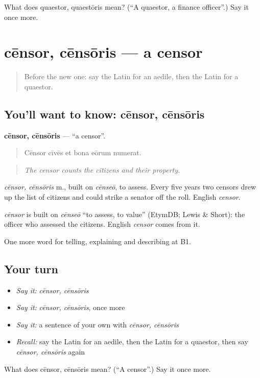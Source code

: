\begin{tcolorbox}[breakable,colback=teal!4,colframe=teal!35!black,title={Before you move on}]
What does quaestor, quaestōris mean? (\textquotedblleft{}A quaestor, a finance officer\textquotedblright{}.) Say it once more.
\end{tcolorbox}
\section[cēnsor, cēnsōris]{cēnsor, cēnsōris — a censor}

\label{lesson:LA-C383-censor}



\begin{quote}
Before the new one: say the Latin for an aedile, then the Latin for a quaestor.
\end{quote}

\subsection*{You'll want to know: cēnsor, cēnsōris}
\textbf{cēnsor, cēnsōris} — \textquotedblleft{}a censor\textquotedblright{}.

\begin{quote}
Cēnsor cīvēs et bona eōrum numerat.
\end{quote}

\begin{quote}
\emph{The censor counts the citizens and their property.}
\end{quote}

\emph{cēnsor, cēnsōris} m., built on \emph{cēnseō}, to assess. Every five years two censors drew up the list of citizens and could strike a senator off the roll. English \emph{censor}.

\begin{cousinweb}
\emph{cēnsor} is built on \emph{cēnseō} \textquotedblleft{}to assess, to value\textquotedblright{} (EtymDB; Lewis \& Short): the officer who assessed the citizens. English \emph{censor} comes from it.
\end{cousinweb}

\begin{grammarlens}[title={What you've built}]
One more word for telling, explaining and describing at B1.
\end{grammarlens}

\subsection*{Your turn}
\begin{itemize}
\raggedright
  \item \emph{Say it:} \emph{cēnsor, cēnsōris}
  \item \emph{Say it:} \emph{cēnsor, cēnsōris}, once more
  \item \emph{Say it:} a sentence of your own with \emph{cēnsor, cēnsōris}
  \item \emph{Recall:} say the Latin for an aedile, then the Latin for a quaestor, then say \emph{cēnsor, cēnsōris} again
\end{itemize}

\begin{tcolorbox}[breakable,colback=teal!4,colframe=teal!35!black,title={Before you move on}]
What does cēnsor, cēnsōris mean? (\textquotedblleft{}A censor\textquotedblright{}.) Say it once more.
\end{tcolorbox}
